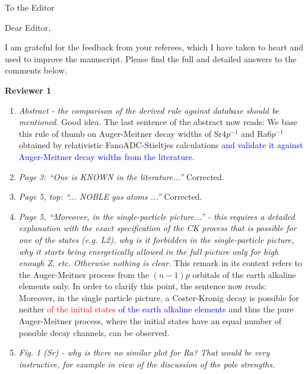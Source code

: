 \documentclass[DIN,pagenumber=false,parskip=half,fromalign=left,fromphone=false,fromemail=true,fromurl=false,fromlogo=false,fromrule=false]{scrlttr2}
\begin{document}
\begin{letter}{To the Editor}
	
	\opening{Dear Editor,}

I am grateful for the feedback from your referees, which I
have taken to heart and
used to improve the manuscript. Please find the full and detailed answers to the
comments below.


\textbf{Reviewer 1}
\begin{enumerate}
 \item \emph{Abstract - the comparison of the derived rule against database
        should be mentioned.}\newline
       Good idea. The last sentence of the abstract now reads:
       We base this rule of thumb on Auger-Meitner decay widths
of Sr$4p^{-1}$ and Ra$6p^{-1}$
obtained by relativistic FanoADC-Stieltjes calculations 
\textcolor{blue}
{and validate it against
Auger-Meitner decay widths from the literature.}
 \item \emph{Page 3: ``One is KNOWN in the literature...'' } \newline
       Corrected.
 \item \emph{Page 5, top: ``... NOBLE gas atoms ...''} \newline
       Corrected.
 \addtocounter{enumi}{1}
 \item 
       \emph{Page 5, ``Moreover, in the single-particle
       picture...'' - this requires a detailed explanation with the exact specification
       of the CK process that is possible for one of the states (e.g. L2), why is
       it forbidden in the single-particle picture, why it starts being energetically
       allowed in the full picture only for high enough Z, etc. Otherwise nothing
       is clear.} \newline
       This remark in its context refers to the Auger-Meitner process from the
       $(n-1)p$ orbitals of the earth alkaline elements only. In order to clarify this
       point, the sentence now reads:
       Moreover, in the single particle picture, a Coster-Kronig decay is possible for neither
\textcolor{red}{of the initial states}
\textcolor{blue}
{of the earth alkaline elements}
and thus the pure Auger-Meitner process, where the initial
states have an equal number of possible decay channels, can be observed.
 \item \emph{Fig. 1 (Sr) - why is there no similar plot for Ra?
             That would be very instructive, for example in view of the discussion
             of the pole strengths.} \newline

\end{enumerate}
\end{letter}
\end{document}
